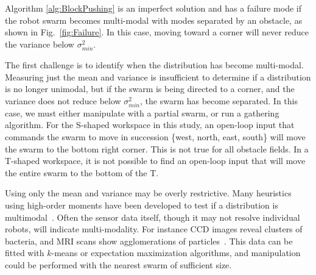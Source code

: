 Algorithm \ref{alg:BlockPushing} is an imperfect solution and has a failure mode if the robot swarm becomes multi-modal with modes separated by an obstacle, as shown in Fig.~\ref{fig:Failure}.  In this case, moving toward a corner will never reduce the variance below $\sigma_{min}^2$.


  The first challenge is to identify when the distribution has become multi-modal.  Measuring just the mean and variance is insufficient to determine if a distribution is no longer unimodal, but if the swarm is being directed to a corner, and the variance does not reduce below $\sigma_{min}^2$, the swarm has become separated. In this case, we must either manipulate with a partial swarm, or run a gathering algorithm.  For the  {\sffamily S}-shaped workspace in this study, an open-loop input that commands the swarm to move in succession \{{\sc west, north, east, south}\} will move the swarm to the bottom right corner.
This is not true for all obstacle fields. In a {\sffamily T}-shaped workspace, it is not possible to find an open-loop input that will move the entire swarm to the bottom of the {\sffamily T}.  
 
  Using only the mean and variance may be overly restrictive.  Many heuristics using high-order moments have been developed to test if a distribution is multimodal~\cite{haldane1951simple}.  Often the sensor data itself, though it may not resolve individual robots, will indicate multi-modality.  For instance CCD images reveal clusters of bacteria, and MRI scans show agglomerations of particles~\cite{stuber2007positive}.  This data can be fitted with $k$-means or expectation maximization algorithms, and manipulation could be performed with the nearest swarm of sufficient size.
  








